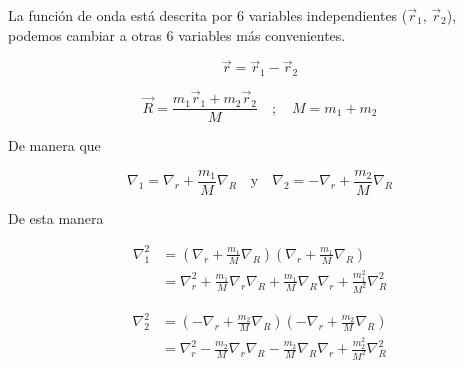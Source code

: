 \begin{frame}{}
    
    La función de onda está descrita por 6 variables independientes ($\Vec{r}_1$, $\Vec{r}_2$), podemos cambiar a otras 6 variables más convenientes.
    
    \begin{equation*}
        \Vec{r} = \Vec{r}_1 - \Vec{r}_2
    \end{equation*}
    
    \begin{equation*}
        \Vec{R} = \frac{ m_1 \Vec{r}_1 + m_2 \Vec{r}_2 }{M} 
        \quad \mathrm{;} \quad
        M = m_1 + m_2
    \end{equation*}
    
    De manera que
    
    \begin{equation*}
        \nabla_1 = \nabla_r + \frac{m_1}{M} \nabla_R
        \quad \mathrm{y} \quad
        \nabla_2 = - \nabla_r + \frac{m_2}{M} \nabla_R
    \end{equation*}
    
\end{frame}

\begin{frame}{}
    
    De esta manera
    
    \begin{align*}
        \nabla_1^2 &= \left( \nabla_r + \frac{m_1}{M} \nabla_R \right)
        \left( \nabla_r + \frac{m_1}{M} \nabla_R \right) \\
        &= \nabla_r^2 + \frac{m_1}{M} \nabla_r \nabla_R + \frac{m_1}{M} \nabla_R \nabla_r + \frac{m_1^2}{M^2} \nabla_R^2
    \end{align*}
    
    \begin{align*}
        \nabla_2^2 &= \left( - \nabla_r + \frac{m_2}{M} \nabla_R \right)
        \left( - \nabla_r + \frac{m_2}{M} \nabla_R \right) \\
        &= \nabla_r^2 - \frac{m_2}{M} \nabla_r \nabla_R - \frac{m_2}{M} \nabla_R \nabla_r + \frac{m_2^2}{M^2} \nabla_R^2
    \end{align*}
    
\end{frame}

